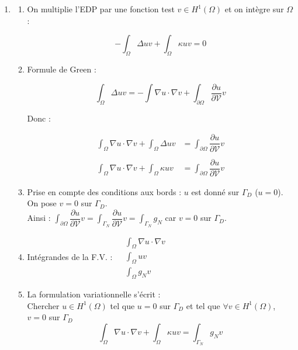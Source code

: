 \documentclass[12pt,a4paper]{article}
\begin{document}
\begin{enumerate}
	\item \begin{enumerate}[label=$\star$]
		\item On multiplie l'EDP par une fonction test $v \in H^1(\Omega)$ et on intègre sur $\Omega$ :
		
		\[
		-\displaystyle\int_\Omega \Delta u v + \int_\Omega \kappa u v = 0
		\]
		
		\item Formule de Green :
		
		\[
		\displaystyle\int_\Omega \Delta uv = - \int \nabla u \cdot\nabla v + \int_{\partial \Omega} \dfrac{\partial u}{\partial \mathcal{V}}v
		\]
		
		Donc :
		
		\[
		\begin{aligned}
			\displaystyle\int_\Omega \nabla u \cdot\nabla v + \int_\Omega \Delta uv &= \int_{\partial \Omega}\dfrac{\partial u}{\partial \mathcal{V}}v\\\\
			\int_\Omega \nabla u \cdot\nabla v + \int_\Omega \kappa uv &= \int_{\partial\Omega}\dfrac{\partial u}{\partial\mathcal{V}}v
		\end{aligned}
		\]
		
		\item Prise en compte des conditions aux bords : $u$ est donné sur $\Gamma_D$ ($u=0$).\\
		
		On pose $v = 0$ sur $\Gamma_D$.\\
		Ainsi : $\displaystyle\int_{\partial\Omega} \dfrac{\partial u}{\partial\mathcal{V}}v = \int_{\Gamma_N} \dfrac{\partial u}{\partial \mathcal{V}}v = \int_{\Gamma_N} g_N$ \hspace{1cm} car $v= 0$ sur $\Gamma_D$.
		
		\item Intégrandes de la F.V. : $\begin{aligned}
			&\displaystyle\int_\Omega \nabla u \cdot \nabla v \\
			&\int_\Omega uv \\
			&\int_\Omega g_N v
		\end{aligned}$
		
		\item La formulation variationnelle s'écrit :\\
		Chercher $u \in H^1(\Omega)$ tel que $u=0$ sur $\Gamma_D$ et tel que $\forall v \in H^1(\Omega)$, $v=0$ sur $\Gamma_D$
		\[
		\displaystyle\int_\Omega \nabla u \cdot \nabla v + \int_\Omega \kappa uv = \int_{\Gamma_N} g_N v
		\]
	\end{enumerate}
	

\end{enumerate}
\end{document}
